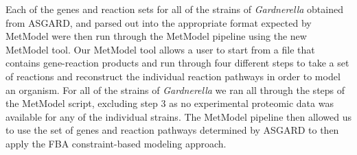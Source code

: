 \indent\indent Each of the genes and reaction sets for all of the strains of \textit{Gardnerella} obtained from ASGARD, and parsed out into the appropriate format expected by MetModel were then run through the MetModel pipeline using the new MetModel tool. Our MetModel tool allows a user to start from a file that contains gene-reaction products and run through four different steps to take a set of reactions and reconstruct the individual reaction pathways in order to model an organism. For all of the strains of \textit{Gardnerella} we ran all through the steps of the MetModel script, excluding step 3 as no experimental proteomic data was available for any of the individual strains. The MetModel pipeline then allowed us to use the set of genes and reaction pathways determined by ASGARD to then apply the FBA constraint-based modeling approach.  \\
%
%
%
%
%


